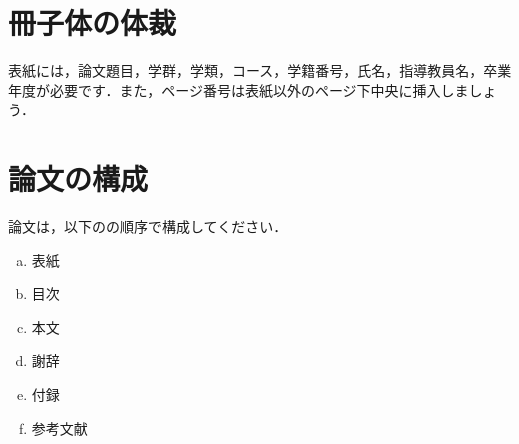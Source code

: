 \documentclass[12pt]{kupaper}
\begin{document}
\chapter{冊子体の体裁}
表紙には，論文題目，学群，学類，コース，学籍番号，氏名，指導教員名，卒業年度が必要です．また，ページ番号は表紙以外のページ下中央に挿入しましょう．

\chapter{論文の構成}\label{chap:論文の構成}
論文は，以下のの順序で構成してください．

	\begin{enumerate}[a.]
		\item 表紙 \label{term:a}
		\item 目次 \label{term:b}
		\item 本文 \label{term:c}
		\item 謝辞 \label{term:d}
		\item 付録 \label{term:e}
		\item 参考文献 \label{term:f}
	\end{enumerate}
\end{document}

